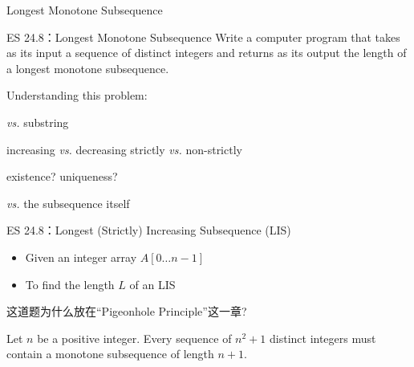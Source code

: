 \begin{frame}{}
  \centerline{\LARGE Longest Monotone Subsequence}
\end{frame}

\begin{frame}{}
  \begin{exampleblock}{ES 24.8：Longest Monotone Subsequence}
    Write a computer program that takes as its input a sequence of distinct integers
    and returns as its output the length of a longest monotone subsequence.
  \end{exampleblock}

  \vspace{0.50cm}
  \pause
  Understanding this problem:

  \vspace{0.20cm}
  \begin{description}[Subsequence]
    \pause
    \item[Subsequence] \emph{vs.} substring
    \pause
    \item[Monotone] increasing \emph{vs.} decreasing \pause \qquad strictly \emph{vs.} non-strictly
    \pause
    \item[Longest] existence? uniqueness?
    \pause
    \item[The Length] \emph{vs.} the subsequence itself
  \end{description}
\end{frame}

\begin{frame}{}
  \begin{exampleblock}{ES 24.8：Longest (Strictly) Increasing Subsequence (LIS)}
    \begin{itemize}
      \item Given an integer array $A[0 \ldots n-1]$
      \item To find the length $L$ of an LIS
    \end{itemize}
  \end{exampleblock}

  \vspace{0.30cm}

\end{frame}

\begin{frame}{}
  \begin{center}
     这道题为什么放在``Pigeonhole Principle''这一章?
  \end{center}

  \pause

  \pause
  \begin{theorem}
     Let $n$ be a positive integer. 
     Every sequence of $n^2 + 1$ distinct integers must contain a monotone subsequence of length $n + 1$.
  \end{theorem}
\end{frame}


